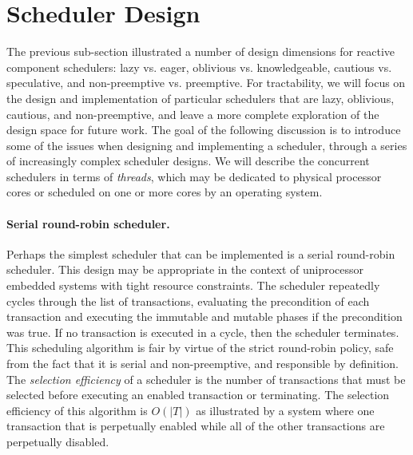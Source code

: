 \section{Scheduler Design}

The previous sub-section illustrated a number of design dimensions for reactive component schedulers:  lazy vs. eager, oblivious vs. knowledgeable, cautious vs. speculative, and non-preemptive vs. preemptive.
For tractability, we will focus on the design and implementation of particular schedulers that are lazy, oblivious, cautious, and non-preemptive, and leave a more complete exploration of the design space for future work.
The goal of the following discussion is to introduce some of the issues when designing and implementing a scheduler, through a series of increasingly complex scheduler designs.
We will describe the concurrent schedulers in terms of \emph{threads}, which may be dedicated to physical processor cores or scheduled on one or more cores by an operating system.


\paragraph{Serial round-robin scheduler.}
Perhaps the simplest scheduler that can be implemented is a serial round-robin scheduler.
This design may be appropriate in the context of uniprocessor embedded systems with tight resource constraints.
The scheduler repeatedly cycles through the list of transactions, evaluating the precondition of each transaction and executing the immutable and mutable phases if the precondition was true.
If no transaction is executed in a cycle, then the scheduler terminates.
This scheduling algorithm is fair by virtue of the strict round-robin policy, safe from the fact that it is serial and non-preemptive, and responsible by definition.
The \emph{selection efficiency} of a scheduler is the number of transactions that must be selected before executing an enabled transaction or terminating.
The selection efficiency of this algorithm is $O(|T|)$ as illustrated by a system where one transaction that is perpetually enabled while all of the other transactions are perpetually disabled.

